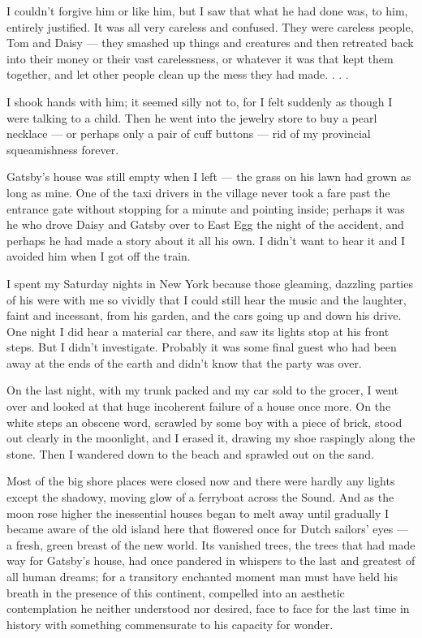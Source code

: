 \documentclass{znotebook}
\begin{document}
I couldn’t forgive him or like him, but I saw that what he had done was, to him, entirely justified. It was all very careless and confused. They were careless people, Tom and Daisy — they smashed up things and creatures and then retreated back into their money or their vast carelessness, or whatever it was that kept them together, and let other people clean up the mess they had made. . . .

I shook hands with him; it seemed silly not to, for I felt suddenly as though I were talking to a child. Then he went into the jewelry store to buy a pearl necklace — or perhaps only a pair of cuff buttons — rid of my provincial squeamishness forever.

Gatsby’s house was still empty when I left — the grass on his lawn had grown as long as mine. One of the taxi drivers in the village never took a fare past the entrance gate without stopping for a minute and pointing inside; perhaps it was he who drove Daisy and Gatsby over to East Egg the night of the accident, and perhaps he had made a story about it all his own. I didn’t want to hear it and I avoided him when I got off the train.

I spent my Saturday nights in New York because those gleaming, dazzling parties of his were with me so vividly that I could still hear the music and the laughter, faint and incessant, from his garden, and the cars going up and down his drive. One night I did hear a material car there, and saw its lights stop at his front steps. But I didn’t investigate. Probably it was some final guest who had been away at the ends of the earth and didn’t know that the party was over.

On the last night, with my trunk packed and my car sold to the grocer, I went over and looked at that huge incoherent failure of a house once more. On the white steps an obscene word, scrawled by some boy with a piece of brick, stood out clearly in the moonlight, and I erased it, drawing my shoe raspingly along the stone. Then I wandered down to the beach and sprawled out on the sand.

Most of the big shore places were closed now and there were hardly any lights except the shadowy, moving glow of a ferryboat across the Sound. And as the moon rose higher the inessential houses began to melt away until gradually I became aware of the old island here that flowered once for Dutch sailors’ eyes — a fresh, green breast of the new world. Its vanished trees, the trees that had made way for Gatsby’s house, had once pandered in whispers to the last and greatest of all human dreams; for a transitory enchanted moment man must have held his breath in the presence of this continent, compelled into an aesthetic contemplation he neither understood nor desired, face to face for the last time in history with something commensurate to his capacity for wonder.
\end{document}
